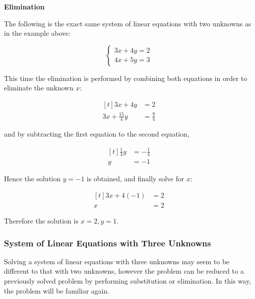 \documentclass[a4paper,12pt]{article}
\begin{document}
\begin{alist}
 \item \textbf{Elimination}\n

 \begin{exm}
  The following is the exact same system of linear equations with two unknowns as in the example above:

  $$\begin{cases}
    3x+4y=2\\
    4x+5y=3
   \end{cases}$$\s

  This time the elimination is performed by combining both equations in order to eliminate the unknown $x$:

  $$\begin{aligned}[t]
    3x+4y&=2\\
    3x+\frac{15}{4}y&=\frac{9}{4}
   \end{aligned}$$\s

  and by subtracting the first equation to the second equation,

  $$\begin{aligned}[t]
    \frac{1}{4}y&=-\frac{1}{4}\\
    y&=-1
   \end{aligned}$$\s

  Hence the solution $y=-1$ is obtained, and finally solve for $x$:

  $$\begin{aligned}[t]
    3x+4(-1)&=2\\
    x&=2
   \end{aligned}$$\s

  Therefore the solution is $x=2,y=1$.
\end{exm}
\end{alist}

\subsubsection{System of Linear Equations with Three Unknowns}
Solving a system of linear equations with three unknowns may seem to be different to that with two unknowns, however the problem can be reduced to a previously solved problem by performing substitution or elimination. In this way, the problem will be familiar again.\n
\end{document}
